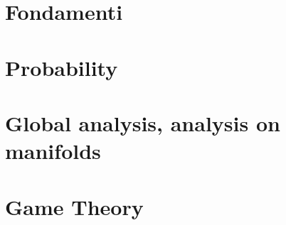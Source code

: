 \documentclass[a4paper,10pt]{book}
\begin{document}
  \tableofcontents

  
  \part{Fondamenti}

  \part{Probability}
  
  
  \part{Global analysis, analysis on manifolds}
  
  
  
  \part{Game Theory}
  
  
 
  \cleardoublepage

  
\end{document}
